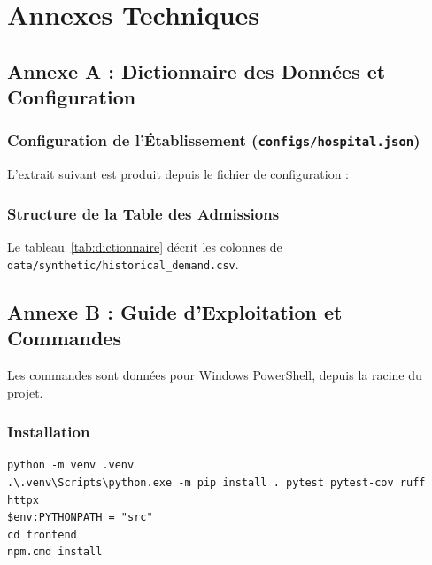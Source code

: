 \chapter*{Annexes Techniques}

\section*{Annexe A : Dictionnaire des Données et Configuration}

\subsection*{Configuration de l'Établissement (\texttt{configs/hospital.json})}
L'extrait suivant est produit depuis le fichier de configuration :


\subsection*{Structure de la Table des Admissions}
Le tableau~\ref{tab:dictionnaire} décrit les colonnes de \texttt{data/synthetic/historical\_demand.csv}.



\newpage
\section*{Annexe B : Guide d'Exploitation et Commandes}

Les commandes sont données pour Windows PowerShell, depuis la racine du projet.

\subsection*{Installation}
\begin{lstlisting}[caption={Installation de l'environnement.}]
python -m venv .venv
.\.venv\Scripts\python.exe -m pip install . pytest pytest-cov ruff httpx
$env:PYTHONPATH = "src"
cd frontend
npm.cmd install
\end{lstlisting}

